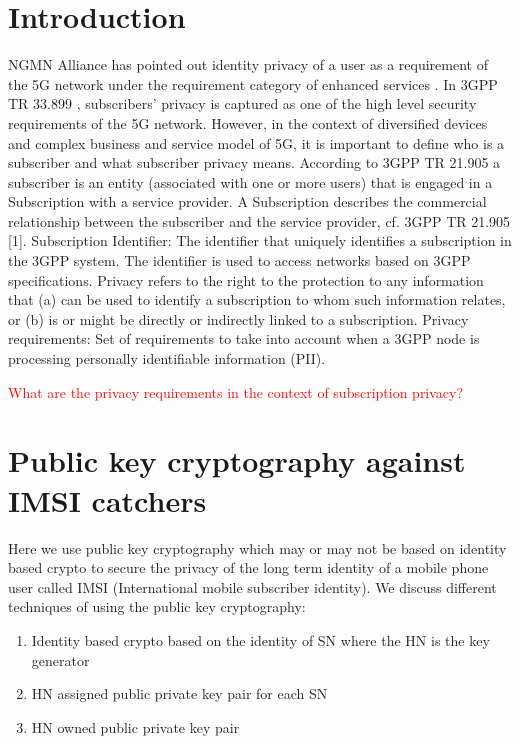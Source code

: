 \documentclass[lnicst,sechang,a4paper]{svmultln}
\begin{document}
\section{Introduction}
\label{intro} NGMN Alliance has pointed out identity privacy of a user as a requirement of the 5G network under the requirement category of enhanced services \cite{NGMN_white_paper}. In 3GPP TR 33.899 \cite{TR33899}, subscribers' privacy is captured as one of the high level security requirements of the 5G network. However, in the context of diversified devices and complex business and service model of 5G, it is important to define who is a subscriber and what subscriber privacy means. According to 3GPP TR 21.905 \cite{TR21905} a subscriber is an entity (associated with one or more users) that is engaged in a Subscription with a service provider. A Subscription describes the commercial relationship between the subscriber and the service provider, cf. 3GPP TR 21.905 [1]. Subscription Identifier: The identifier that uniquely identifies a subscription in the 3GPP system. The identifier is used to access networks based on 3GPP specifications. Privacy refers to the right to the protection to any information that (a) can be used to identify a subscription to whom such information relates, or (b) is or might be directly or indirectly linked to a subscription. Privacy requirements: Set of requirements to take into account when a 3GPP node is processing personally identifiable information (PII). 

\textcolor{red}{What are the privacy requirements in the context of subscription privacy?}

\section{Public key cryptography against IMSI catchers}
Here we use public key cryptography which may or may not be based on identity based crypto to secure the privacy of the long term identity of a mobile phone user called IMSI (International mobile subscriber identity). We discuss different techniques of using the public key cryptography:

\begin{enumerate}
\item Identity based crypto based on the identity of SN where the HN is the key generator
\item HN assigned public private key pair for each SN
\item HN owned public private key pair
\end{enumerate}
\end{document}
